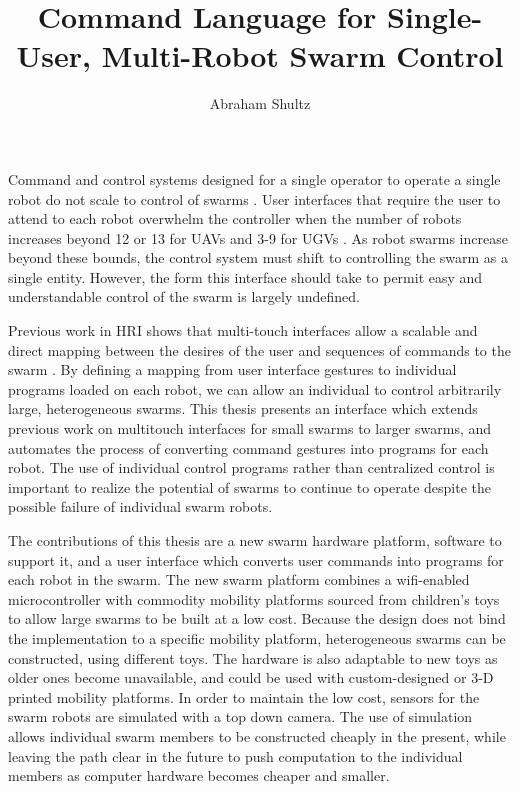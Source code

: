 \documentclass[]{article}
\title{Command Language for Single-User, Multi-Robot Swarm Control}
\author{Abraham Shultz}
\begin{document}
\maketitle

\begin{abstract}

\end{abstract}

Command and control systems designed for a single operator to operate a single robot do not scale to control of swarms \cite{WangSearchScale}. User interfaces that require the user to attend to each robot overwhelm the controller when the number of robots increases beyond 12 or 13 for UAVs and 3-9 for UGVs \cite{WangSearchScale}.
As robot swarms increase beyond these bounds, the control system must shift to controlling the swarm as a single entity. 
However, the form this interface should take to permit easy and understandable control of the swarm is largely undefined. 

Previous work in HRI shows that multi-touch interfaces allow a scalable and direct mapping between the desires of the user and sequences of commands to the swarm \cite{micire2009multi}.
By defining a mapping from user interface gestures to individual programs loaded on each robot, we can allow an individual to control arbitrarily large, heterogeneous swarms.
This thesis presents an interface which extends previous work on multitouch interfaces for small swarms to larger swarms, and automates the process of converting command gestures into programs for each robot. 
The use of individual control programs rather than centralized control is important to realize the potential of swarms to continue to operate despite the possible failure of individual swarm robots. 

The contributions of this thesis are a new swarm hardware platform, software to support it, and a user interface which converts user commands into programs for each robot in the swarm. 
The new swarm platform combines a wifi-enabled microcontroller with commodity mobility platforms sourced from children's toys to allow large swarms to be built at a low cost. 
Because the design does not bind the implementation to a specific mobility platform, heterogeneous swarms can be constructed, using different toys. 
The hardware is also adaptable to new toys as older ones become unavailable, and could be used with custom-designed or 3-D printed mobility platforms. 
In order to maintain the low cost, sensors for the swarm robots are simulated with a top down camera. The use of simulation allows individual swarm members to be constructed cheaply in the present, while leaving the path clear in the future to push computation to the individual members as computer hardware becomes cheaper and smaller.
\end{document}
